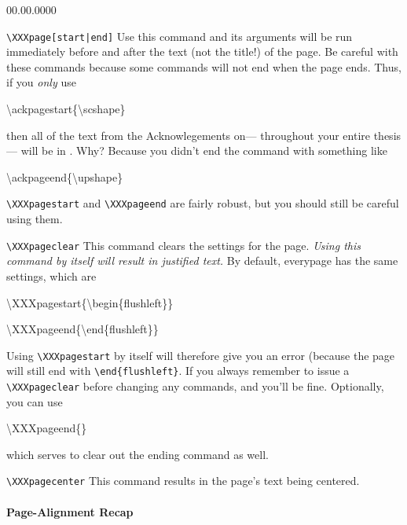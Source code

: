 \begin{lyxlist}{00.00.0000}
\item [\texttt{\textbackslash{}XXXpage{[}start|end{]}}]Use this command
and its arguments will be run immediately before and after the text
(not the title!) of the page. Be careful with these commands because
some commands will not end when the page ends. Thus, if you \emph{only}
use

\begin{lyxcode}
\textbackslash{}ackpagestart\{\textbackslash{}scshape\}
\end{lyxcode}
then all of the text from the Acknowlegements on--- throughout your
entire thesis--- will be in . Why? Because you
didn't end the command with something like 

\begin{lyxcode}
\textbackslash{}ackpageend\{\textbackslash{}upshape\}
\end{lyxcode}
\texttt{\textbackslash{}XXXpagestart} and \texttt{\textbackslash{}XXXpageend}
are fairly robust, but you should still be careful using them.

\item [\texttt{\textbackslash{}XXXpageclear}]This command clears the settings
for the page. \emph{Using this command by itself will result in justified
text.} By default, everypage has the same settings, which are

\begin{lyxcode}
\textbackslash{}XXXpagestart\{\textbackslash{}begin\{flushleft\}\}

\textbackslash{}XXXpageend\{\textbackslash{}end\{flushleft\}\}
\end{lyxcode}
Using \texttt{\textbackslash{}XXXpagestart} by itself will therefore
give you an error (because the page will still end with \texttt{\textbackslash{}end\{flushleft\}}.
If you always remember to issue a \texttt{\textbackslash{}XXXpageclear}
before changing any commands, and you'll be fine. Optionally, you
can use

\begin{lyxcode}
\textbackslash{}XXXpageend\{\}
\end{lyxcode}
which serves to clear out the ending command as well.

\item [\texttt{\textbackslash{}XXXpagecenter}]This command results in the
page's text being centered.
\end{lyxlist}

\paragraph{Page-Alignment Recap}

